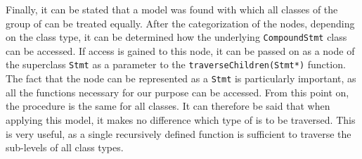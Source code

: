 Finally, it can be stated that a model was found with which all classes of the group of \PARSTAS can be treated equally. After the categorization of the nodes, depending on the class type, it can be determined how the underlying \lstinline{CompoundStmt} class can be accessed. If access is gained to this node, it can be passed on as a node of the superclass \lstinline{Stmt} as a parameter to the \lstinline{traverseChildren(Stmt*)} function. The fact that the node can be represented as a \lstinline{Stmt} is particularly important, as all the functions necessary for our purpose can be accessed. From this point on, the procedure is the same for all classes. It can therefore be said that when applying this model, it makes no difference which type of \PARSTA is to be traversed. This is very useful, as a single recursively defined function is sufficient to traverse the sub-levels of all class types.
